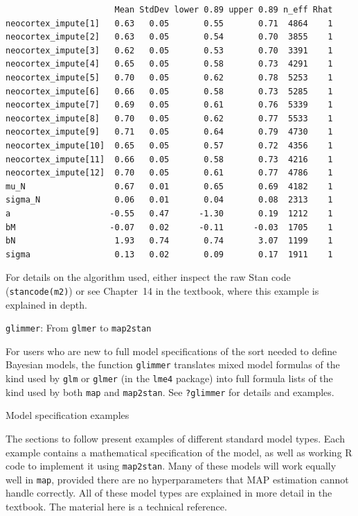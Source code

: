 \documentclass[11pt,reqno]{amsart}
\makeatletter
\renewcommand\section{\@startsection{section}{1}
\z@{.7\linespacing\@plus\linespacing}{.5\linespacing}
{\large\bfseries\centering\color{myblue}}}
\renewcommand\subsection{\@startsection{subsection}{2}
\z@{.5\linespacing\@plus.7\linespacing}{-.5em}%
{\normalfont\normalsize\bfseries}}
\newcommand{\outputboxe}{\normalsize}
\newcommand{\ttx}[1]{\texttt{#1}}
\makeatother
\begin{document}
\begin{verbatim}
                      Mean StdDev lower 0.89 upper 0.89 n_eff Rhat
neocortex_impute[1]   0.63   0.05       0.55       0.71  4864    1
neocortex_impute[2]   0.63   0.05       0.54       0.70  3855    1
neocortex_impute[3]   0.62   0.05       0.53       0.70  3391    1
neocortex_impute[4]   0.65   0.05       0.58       0.73  4291    1
neocortex_impute[5]   0.70   0.05       0.62       0.78  5253    1
neocortex_impute[6]   0.66   0.05       0.58       0.73  5285    1
neocortex_impute[7]   0.69   0.05       0.61       0.76  5339    1
neocortex_impute[8]   0.70   0.05       0.62       0.77  5533    1
neocortex_impute[9]   0.71   0.05       0.64       0.79  4730    1
neocortex_impute[10]  0.65   0.05       0.57       0.72  4356    1
neocortex_impute[11]  0.66   0.05       0.58       0.73  4216    1
neocortex_impute[12]  0.70   0.05       0.61       0.77  4786    1
mu_N                  0.67   0.01       0.65       0.69  4182    1
sigma_N               0.06   0.01       0.04       0.08  2313    1
a                    -0.55   0.47      -1.30       0.19  1212    1
bM                   -0.07   0.02      -0.11      -0.03  1705    1
bN                    1.93   0.74       0.74       3.07  1199    1
sigma                 0.13   0.02       0.09       0.17  1911    1
\end{verbatim}
\outputboxe
For details on the algorithm used, either inspect the raw Stan code (\ttx{stancode(m2)}) or see Chapter~14 in the textbook, where this example is explained in depth.

\subsection{\texttt{glimmer}: From \texttt{glmer} to \texttt{map2stan}}

For users who are new to full model specifications of the sort needed to define Bayesian models, the function \ttx{glimmer} translates mixed model formulas of the kind used by \ttx{glm} or \ttx{glmer} (in the \ttx{lme4} package) into full formula lists of the kind used by both \ttx{map} and \ttx{map2stan}. See \ttx{?glimmer} for details and examples.


\section{Model specification examples}

The sections to follow present examples of different standard model types. Each example contains a mathematical specification of the model, as well as working \textsf{R} code to implement it using \ttx{map2stan}. Many of these models will work equally well in \ttx{map}, provided there are no hyperparameters that MAP estimation cannot handle correctly. All of these model types are explained in more detail in the textbook. The material here is a technical reference.
\end{document}
